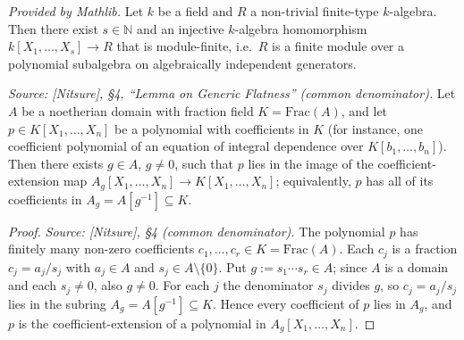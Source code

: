 \begin{lemma}
  \label{lem:noether_normalization_fg}
  \mathlibok
  \textit{Provided by Mathlib.}
  Let \(k\) be a field and \(R\) a non-trivial finite-type \(k\)-algebra. Then there
  exist \(s \in \mathbb{N}\) and an injective \(k\)-algebra homomorphism
  \(k[X_1, \dots, X_s] \to R\) that is module-finite, i.e.\ \(R\) is a finite module
  over a polynomial subalgebra on algebraically independent generators.
\end{lemma}

\begin{lemma}


  \label{lem:gf_clear_one_denominator}
  \textit{Source: [Nitsure], \S4, ``Lemma on Generic Flatness'' (common denominator).}
  Let \(A\) be a noetherian domain with fraction field \(K = \mathrm{Frac}(A)\), and let
  \(p \in K[X_1, \dots, X_n]\) be a polynomial with coefficients in \(K\) (for instance,
  one coefficient polynomial of an equation of integral dependence over
  \(K[b_1, \dots, b_n]\)). Then there exists \(g \in A\), \(g \ne 0\), such that \(p\)
  lies in the image of the coefficient-extension map
  \(A_g[X_1, \dots, X_n] \to K[X_1, \dots, X_n]\); equivalently, \(p\) has all of its
  coefficients in \(A_g = A[g^{-1}] \subseteq K\).
\end{lemma}

\begin{proof}

\leanok
  \textit{Source: [Nitsure], \S4 (common denominator).}
  The polynomial \(p\) has finitely many non-zero coefficients
  \(c_1, \dots, c_r \in K = \mathrm{Frac}(A)\). Each \(c_j\) is a fraction
  \(c_j = a_j / s_j\) with \(a_j \in A\) and \(s_j \in A \setminus \{0\}\). Put
  \(g := s_1 \cdots s_r \in A\); since \(A\) is a domain and each \(s_j \ne 0\), also
  \(g \ne 0\). For each \(j\) the denominator \(s_j\) divides \(g\), so
  \(c_j = a_j / s_j\) lies in the subring \(A_g = A[g^{-1}] \subseteq K\). Hence every
  coefficient of \(p\) lies in \(A_g\), and \(p\) is the coefficient-extension of a
  polynomial in \(A_g[X_1, \dots, X_n]\).
\end{proof}

